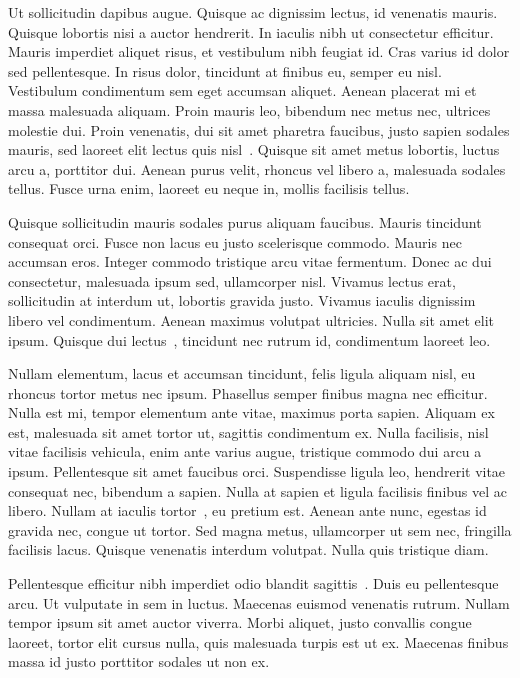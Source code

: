 Ut sollicitudin dapibus augue. Quisque ac dignissim lectus, id venenatis mauris. Quisque lobortis nisi a auctor hendrerit. In iaculis nibh ut consectetur efficitur. Mauris imperdiet aliquet risus, et vestibulum nibh feugiat id. Cras varius id dolor sed pellentesque. In risus dolor, tincidunt at finibus eu, semper eu nisl. Vestibulum condimentum sem eget accumsan aliquet. Aenean placerat mi et massa malesuada aliquam. Proin mauris leo, bibendum nec metus nec, ultrices molestie dui. Proin venenatis, dui sit amet pharetra faucibus, justo sapien sodales mauris, sed laoreet elit lectus quis nisl~\cite{mastersthesis}. Quisque sit amet metus lobortis, luctus arcu a, porttitor dui. Aenean purus velit, rhoncus vel libero a, malesuada sodales tellus. Fusce urna enim, laoreet eu neque in, mollis facilisis tellus.

Quisque sollicitudin mauris sodales purus aliquam faucibus. Mauris tincidunt consequat orci. Fusce non lacus eu justo scelerisque commodo. Mauris nec accumsan eros. Integer commodo tristique arcu vitae fermentum. Donec ac dui consectetur, malesuada ipsum sed, ullamcorper nisl. Vivamus lectus erat, sollicitudin at interdum ut, lobortis gravida justo. Vivamus iaculis dignissim libero vel condimentum. Aenean maximus volutpat ultricies. Nulla sit amet elit ipsum. Quisque dui lectus~\cite{misc}, tincidunt nec rutrum id, condimentum laoreet leo.

Nullam elementum, lacus et accumsan tincidunt, felis ligula aliquam nisl, eu rhoncus tortor metus nec ipsum. Phasellus semper finibus magna nec efficitur. Nulla est mi, tempor elementum ante vitae, maximus porta sapien. Aliquam ex est, malesuada sit amet tortor ut, sagittis condimentum ex. Nulla facilisis, nisl vitae facilisis vehicula, enim ante varius augue, tristique commodo dui arcu a ipsum. Pellentesque sit amet faucibus orci. Suspendisse ligula leo, hendrerit vitae consequat nec, bibendum a sapien. Nulla at sapien et ligula facilisis finibus vel ac libero. Nullam at iaculis tortor~\cite{phdthesis}, eu pretium est. Aenean ante nunc, egestas id gravida nec, congue ut tortor. Sed magna metus, ullamcorper ut sem nec, fringilla facilisis lacus. Quisque venenatis interdum volutpat. Nulla quis tristique diam.

Pellentesque efficitur nibh imperdiet odio blandit sagittis~\cite{unpublished}. Duis eu pellentesque arcu. Ut vulputate in sem in luctus. Maecenas euismod venenatis rutrum. Nullam tempor ipsum sit amet auctor viverra. Morbi aliquet, justo convallis congue laoreet, tortor elit cursus nulla, quis malesuada turpis est ut ex. Maecenas finibus massa id justo porttitor sodales ut non ex.
